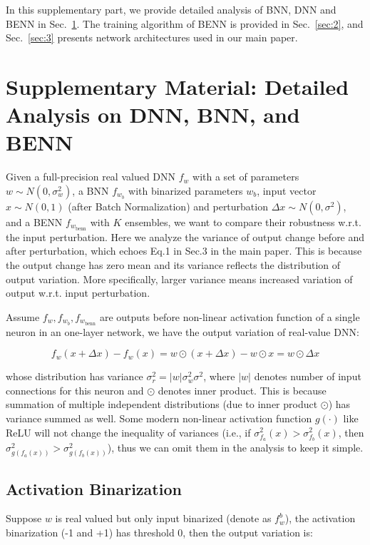 \documentclass[10pt,twocolumn,letterpaper]{article}
\begin{document}
\small
\nocite{*}



\newpage
In this supplementary part, we provide detailed analysis of BNN, DNN and BENN in Sec.~\ref{sec:1}. The training algorithm of BENN is provided in Sec.~\ref{sec:2}, and Sec.~\ref{sec:3} presents network architectures used in our main paper.

\section{Supplementary Material: Detailed Analysis on DNN, BNN, and BENN}
\label{sec:1}

Given a full-precision real valued DNN $f_{w}$ with a set of parameters $w \sim N(0,\sigma_{w}^{2})$, a BNN $f_{w_{b}}$ with binarized parameters $w_{b}$, input vector $x \sim N(0,1)$ (after Batch Normalization) and perturbation $\Delta x \sim N(0,\sigma^{2})$, and a BENN $f_{w_{\text{benn}}}$ with $K$ ensembles, we want to compare their robustness w.r.t. the input perturbation. Here we analyze the variance of output change before and after perturbation, which echoes Eq.1 in Sec.3 in the main paper. This is because the output change has zero mean and its variance reflects the distribution of output variation. More specifically, larger variance means increased variation of output w.r.t. input perturbation.

Assume $f_{w}, f_{w_{b}}, f_{w_{\text{benn}}}$ are outputs before non-linear activation function of a single neuron in an one-layer network, we have the output variation of real-value DNN:

\[
    f_{w}(x+\Delta x) - f_{w}(x) = w \odot (x+\Delta x) - w \odot x = w \odot \Delta x
\]

whose distribution has variance $\sigma_{r}^{2} = |w|\sigma_{w}^{2}\sigma^{2}$, where $|w|$ denotes number of input connections for this neuron and $\odot$ denotes inner product. This is because summation of multiple independent distributions (due to inner product $\odot$) has variance summed as well. Some modern non-linear activation function $g(\cdot)$ like ReLU will not change the inequality of variances (i.e., if $\sigma_{f_{a}}^{2}(x) > \sigma_{f_{b}}^{2}(x)$, then $\sigma_{g(f_{a}(x))}^{2} > \sigma_{g(f_{b}(x))}^{2}$), thus we can omit them in the analysis to keep it simple.

\subsection{Activation Binarization}
\label{sec:acb}
Suppose $w$ is real valued but only input binarized (denote as $f_{w}^{b}$), the activation binarization (-1 and +1) has threshold 0, then the output variation is:
\end{document}
